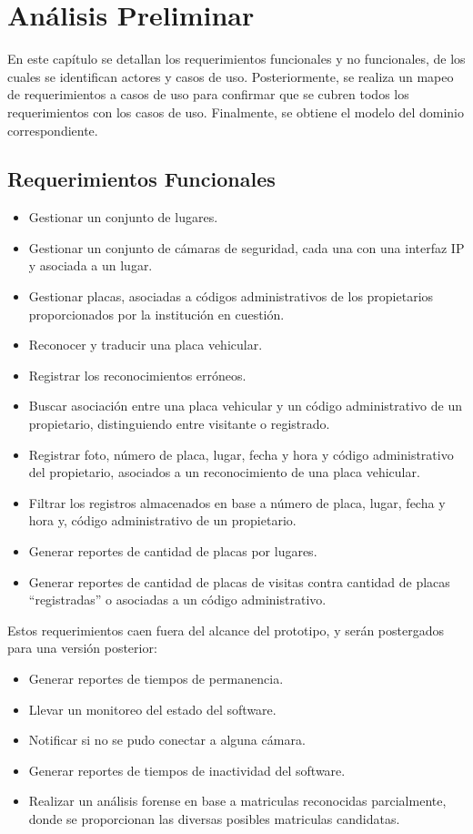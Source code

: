 \chapter{Análisis Preliminar}
En este capítulo se detallan los requerimientos funcionales y no funcionales, de los cuales se identifican actores y casos de uso. Posteriormente, se realiza un mapeo de requerimientos a casos de uso para confirmar que se cubren todos los requerimientos con los casos de uso. Finalmente, se obtiene el modelo del dominio correspondiente.
\section{Requerimientos Funcionales}
\begin{itemize}
    \item Gestionar un conjunto de lugares.
    \item Gestionar un conjunto de cámaras de seguridad, cada una con una interfaz IP y asociada a un lugar.
    \item Gestionar placas, asociadas a códigos administrativos de los propietarios proporcionados por la institución en cuestión.
    \item Reconocer y traducir una placa vehicular. 
    \item Registrar los reconocimientos erróneos.
    \item Buscar asociación entre una placa vehicular y un código administrativo de un propietario, distinguiendo entre visitante o registrado.
    \item Registrar foto, número de placa, lugar, fecha y hora y código administrativo del propietario, asociados a un reconocimiento de una placa vehicular.
    \item Filtrar los registros almacenados en base a número de placa, lugar, fecha y hora y, código administrativo de un propietario.
    \item Generar reportes de cantidad de placas por lugares.
    \item Generar reportes de cantidad de placas de visitas contra cantidad de placas “registradas” o asociadas a un código administrativo.
\end{itemize}
Estos requerimientos caen fuera del alcance del prototipo, y serán postergados para una versión posterior:
\begin{itemize}
\item Generar reportes de tiempos de permanencia.
\item Llevar un monitoreo del estado del software.
\item Notificar si no se pudo conectar a alguna cámara.
\item Generar reportes de tiempos de inactividad del software.
\item Realizar un análisis forense en base a matriculas reconocidas parcialmente, donde se proporcionan las diversas posibles matriculas candidatas.
\end{itemize}


